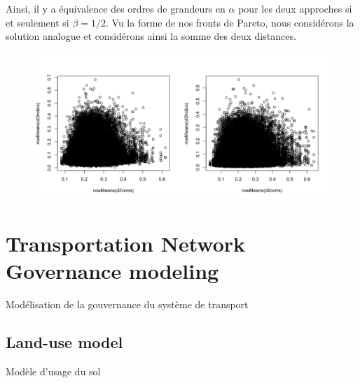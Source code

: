 Ainsi, il y a équivalence des ordres de grandeurs en $\alpha$ pour les deux approches si et seulement si $\beta = 1/2$. Vu la forme de nos fronts de Pareto, nous considérons la solution analogue et considérons ainsi la somme des deux distances.


\begin{figure}
	\includegraphics[width=\linewidth]{Figures/Final/A-mesocoevolmodel-paretodists.jpg}
\end{figure}








\newpage

\section{Transportation Network Governance modeling}{Modélisation de la gouvernance du système de transport}

\label{app:sec:lutecia}


\subsection{Land-use model}{Modèle d'usage du sol}


